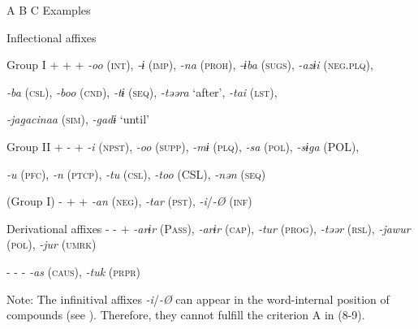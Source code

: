   A  B  C  Examples

Inflectional affixes        

  Group I  +  +  +  \textit{{}-oo} (\textsc{int}), \textit{{}-ɨ} (\textsc{imp}), \textit{{}-na} (\textsc{proh}), \textit{{}-ɨba} (\textsc{sugs}), \textit{{}-azɨi} (\textsc{neg}.\textsc{plq}),

\textit{{}-ba} (\textsc{csl}), \textit{{}-boo} (\textsc{cnd}), \textit{{}-tɨ} (\textsc{seq}), \textit{{}-təəra} ‘after’, \textit{{}-tai} (\textsc{lst}),

\textit{{}-jagacinaa} (\textsc{sim}), \textit{{}-gadɨ} ‘until’

  Group II  +  {}-  +  \textit{{}-i} (\textsc{npst}), \textit{{}-oo} (\textsc{supp}), \textit{{}-mɨ} (\textsc{plq}), \textit{{}-sa} (\textsc{pol}), \textit{{}-sɨga} (POL),

\textit{{}-u} (\textsc{pfc}), \textit{{}-n} (\textsc{ptcp}), \textit{{}-tu} (\textsc{csl}), \textit{{}-too} (CSL), \textit{{}-nən} (\textsc{seq})

  (Group I)  {}-  +  +  \textit{{}-an} (\textsc{neg}), \textit{-tar} (\textsc{pst}), \textit{{}-i}/\textit{{}-Ø} (\textsc{inf})

Derivational affixes  {}-  {}-  +  \textit{{}-arɨr} (P\textsc{ass}), \textit{-arɨr} (\textsc{cap}), \textit{-tur} (\textsc{prog}), \textit{{}-təər} (\textsc{rsl}), \textit{{}-jawur} (\textsc{pol}), \textit{{}-jur} (\textsc{umrk})

  {}-  {}-  {}-  \textit{{}-as} (\textsc{caus}), \textit{{}-tuk} (\textsc{prpr})

Note: The infinitival affixes \textit{{}-i}/\textit{{}-Ø} can appear in the word-internal position of compounds (see ). Therefore, they cannot fulfill the criterion A in (8-9).

